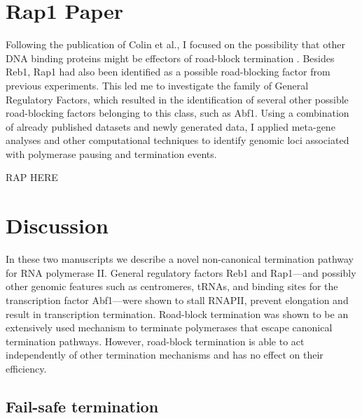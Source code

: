 \section{Rap1 Paper}

Following the publication of Colin et al., I focused on the possibility that other DNA binding proteins might be effectors of road-block termination \invivo{}. 
Besides Reb1, Rap1 had also been identified as a possible road-blocking factor from previous experiments. 
This led me to investigate the family of General Regulatory Factors, which resulted in the identification of several other possible road-blocking factors belonging to this class, such as Abf1. 
Using a combination of already published datasets and newly generated data, I applied meta-gene analyses and other computational techniques to identify genomic loci associated with polymerase pausing and termination events. 


\clearpage


%
RAP HERE

\clearpage

\section{Discussion}


In these two manuscripts we describe a novel non-canonical termination pathway for RNA polymerase II.
General regulatory factors Reb1 and Rap1—and possibly other genomic features such as centromeres, tRNAs, and binding sites for the transcription factor Abf1—were shown to stall RNAPII, prevent elongation and result in transcription termination.  
Road-block termination was shown to be an extensively used mechanism to terminate polymerases that escape canonical termination pathways. 
However, road-block termination is able to act independently of other termination mechanisms and has no effect on their efficiency. 

\subsection{Fail-safe termination}

